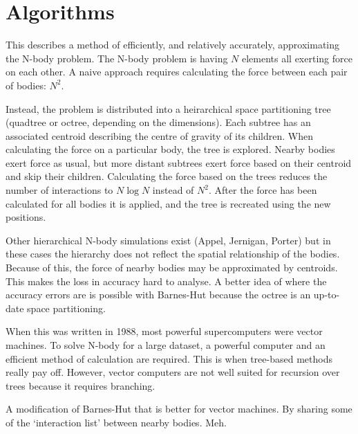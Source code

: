 \section{Algorithms}

This describes a method of efficiently, and relatively accurately, approximating the N-body problem. 
The N-body problem is having $N$ elements all exerting force on each other. A naive approach requires calculating the force between each pair of bodies: $N^2$.

Instead, the problem is distributed into a heirarchical space partitioning tree (quadtree or octree, depending on the dimensions).
Each subtree has an associated centroid describing the centre of gravity of its children.
When calculating the force on a particular body, the tree is explored. Nearby bodies exert force as usual, but more distant subtrees exert force based on their centroid and skip their children.
Calculating the force based on the trees reduces the number of interactions to $N \log N$ instead of $N^2$.
After the force has been calculated for all bodies it is applied, and the tree is recreated using the new positions.

Other hierarchical N-body simulations exist (Appel, Jernigan, Porter) but in these cases the hierarchy does not reflect the spatial relationship of the bodies.
Because of this, the force of nearby bodies may be approximated by centroids. This makes the loss in accuracy hard to analyse.
A better idea of where the accuracy errors are is possible with Barnes-Hut because the octree is an up-to-date space partitioning.

When this was written in 1988, most powerful supercomputers were vector machines.
To solve N-body for a large dataset, a powerful computer and an efficient method of calculation are required.
This is when tree-based methods really pay off.
However, vector computers are not well suited for recursion over trees because it requires branching.

A modification of Barnes-Hut that is better for vector machines. By sharing some of the `interaction list' between nearby bodies.
Meh.



